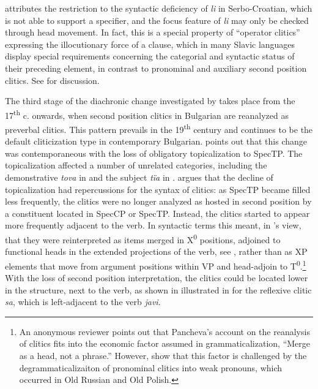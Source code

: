 \documentclass[output=paper,
modfonts,
newtxmath,
hidelinks
]{langscibook}
\begin{document}
{\noindent \citet[31ff.]{Boskovic2001} attributes the restriction to the syntactic deficiency of \textit{li} in Serbo-Croatian, which is not able to support a specifier, and the focus feature of \textit{li} may only be checked through head movement. In fact, this is a special property of “operator clitics” expressing the illocutionary force of a clause, which in many Slavic languages display special requirements concerning the categorial and syntactic status of their preceding element, in contrast to pronominal and auxiliary second position clitics. See \citet[Chapter 3]{migdalski2016} for discussion.}

The third stage of the diachronic change investigated by \citeauthor{pancheva2005} takes place from the 17\textsuperscript{th} c. onwards, when second position clitics in Bulgarian are reanalyzed as preverbal clitics. This pattern prevails in the 19\textsuperscript{th} century and continues to be the default cliticization type in contemporary Bulgarian. \citeauthor{pancheva2005} points out that this change was contemporaneous with the loss of obligatory topicalization to SpecTP. The topicalization affected a number of unrelated categories, including the demonstrative \textit{tova} in  and the subject \textit{tïa} in . \citeauthor{pancheva2005} argues that the decline of topicalization had repercussions for the syntax of clitics: as SpecTP became filled less frequently, the clitics were no longer analyzed as hosted in second position by a constituent located in SpecCP or SpecTP. Instead, the clitics started to appear more frequently adjacent to the verb. In syntactic terms this meant, in \citeauthor{pancheva2005}’s view, that they were reinterpreted as items merged in X\textsuperscript{0} positions, adjoined to functional heads in the extended projections of the verb, see , rather than as XP elements that move from argument positions within VP and head-adjoin to T\textsuperscript{0}.\footnote{\label{fn2}An anonymous reviewer points out that Pancheva’s account on the reanalysis of clitics fits into the economic factor assumed in grammaticalization, “Merge as a head, not a phrase.” However, \citet{jung-migdalski2015} show that this factor is challenged by the degrammaticalizaiton of pronominal clitics into weak pronouns, which occurred in Old Russian and Old Polish.} With the loss of second position interpretation, the clitics could be located lower in the structure, next to the verb, as shown in illustrated in  for the reflexive clitic \textit{sa}, which is left-adjacent to the verb \textit{javi}. 
\end{document}
